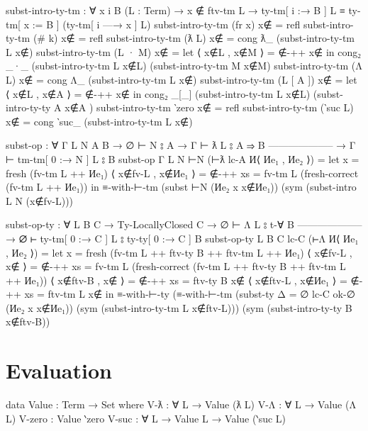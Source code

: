 \documentclass[logo,bsc,singlespacing,parskip,online]{infthesis}
\renewenvironment{code}{\mintedcopy[breaklines,breaksymbolleft=\;]{agda}}{\endmintedcopy}
\begin{document}
\begin{code}
  subst-intro-ty-tm : ∀ {x i B} (L : Term)
    → x ∉ ftv-tm L
    → ty-tm[ i :→ B ] L ≡ ty-tm[ x := B ] (ty-tm[ i —→ x ] L)
  subst-intro-ty-tm (fr x) x∉ = refl
  subst-intro-ty-tm (# k) x∉ = refl
  subst-intro-ty-tm (ƛ L) x∉ = cong ƛ_ (subst-intro-ty-tm L x∉)
  subst-intro-ty-tm (L · M) x∉ = let ⟨ x∉L , x∉M ⟩ = ∉-++ x∉
    in cong₂ _·_ (subst-intro-ty-tm L x∉L) (subst-intro-ty-tm M x∉M)
  subst-intro-ty-tm (Λ L) x∉ = cong Λ_ (subst-intro-ty-tm L x∉)
  subst-intro-ty-tm (L [ A ]) x∉ = let ⟨ x∉L , x∉A ⟩ = ∉-++ x∉
    in cong₂ _[_] (subst-intro-ty-tm L x∉L) (subst-intro-ty-ty A x∉A )
  subst-intro-ty-tm ‵zero x∉ = refl
  subst-intro-ty-tm (‵suc L) x∉ = cong ‵suc_ (subst-intro-ty-tm L x∉)

  subst-op : ∀ {Γ L N A B}
    → ∅ ⊢ N ⦂ A
    → Γ ⊢ ƛ L ⦂ A ⇒ B
      --------------------
    → Γ ⊢ tm-tm[ 0 :→ N ] L ⦂ B
  subst-op {Γ} {L} {N} ⊢N (⊢ƛ lc-A И⟨ Иe₁ , Иe₂ ⟩) =
    let x                  = fresh (fv-tm L ++ Иe₁)
        ⟨ x∉fv-L , x∉Иe₁ ⟩ = ∉-++ {xs = fv-tm L}
                                (fresh-correct (fv-tm L ++ Иe₁))
    in ≡-with-⊢-tm
      (subst ⊢N (Иe₂ x {x∉Иe₁}))
      (sym (subst-intro L N (x∉fv-L)))

  subst-op-ty : ∀ {L B C}
    → Ty-LocallyClosed C
    → ∅ ⊢ Λ L ⦂ t-∀ B
      --------------------
    → ∅ ⊢ ty-tm[ 0 :→ C ] L ⦂ ty-ty[ 0 :→ C ] B
  subst-op-ty {L} {B} {C} lc-C (⊢Λ И⟨ Иe₁ , Иe₂ ⟩) =
    let x = fresh (fv-tm L ++ ftv-ty B ++ ftv-tm L ++ Иe₁)
        ⟨ x∉fv-L , x∉ ⟩ = ∉-++ {xs = fv-tm L}
          (fresh-correct (fv-tm L ++ ftv-ty B ++ ftv-tm L ++ Иe₁))
        ⟨ x∉ftv-B , x∉ ⟩ = ∉-++ {xs = ftv-ty B} x∉
        ⟨ x∉ftv-L , x∉Иe₁ ⟩ = ∉-++ {xs = ftv-tm L} x∉
    in ≡-with-⊢-ty
      (≡-with-⊢-tm
        (subst-ty {Δ = ∅} lc-C ok-∅ (Иe₂ x {x∉Иe₁}))
        (sym (subst-intro-ty-tm L x∉ftv-L)))
      (sym (subst-intro-ty-ty B x∉ftv-B))
\end{code}

\section{Evaluation}
\begin{code}
  data Value : Term → Set where
    V-ƛ : ∀ {L} → Value (ƛ L)
    V-Λ : ∀ {L} → Value (Λ L)
    V-zero : Value ‵zero
    V-suc : ∀ {L} → Value L → Value (‵suc L)
\end{code}
\end{document}
